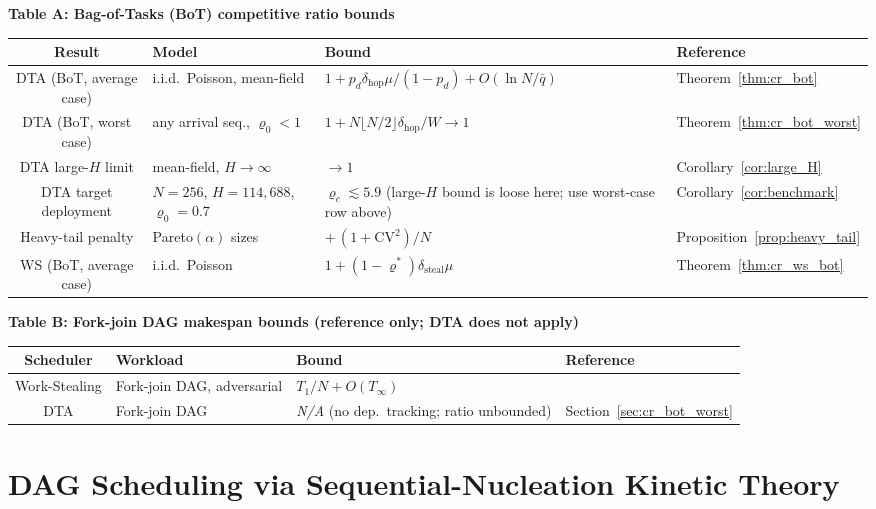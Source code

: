 \documentclass[11pt,a4paper]{report}
\begin{document}
\medskip
\noindent\textbf{Table A: Bag-of-Tasks (BoT) competitive ratio bounds}

\begin{center}
\begin{tabularx}{\textwidth}{@{}clXl@{}}
\toprule
Result & Model & Bound & Reference \\
\midrule
DTA (BoT, average case) & i.i.d.\ Poisson, mean-field
  & $1 + p_d\delta_{\mathrm{hop}}\mu/(1-p_d) + O(\ln N/\bar q)$
  & Theorem~\ref{thm:cr_bot} \\
DTA (BoT, worst case) & any arrival seq., $\varrho_0 < 1$
  & $1 + N\lfloor N/2\rfloor\delta_{\mathrm{hop}}/W \to 1$
  & Theorem~\ref{thm:cr_bot_worst} \\
DTA large-$H$ limit & mean-field, $H\to\infty$
  & $\to 1$
  & Corollary~\ref{cor:large_H} \\
DTA target deployment & $N=256$, $H=114{,}688$, $\varrho_0{=}0.7$
  & $\varrho_c \lesssim 5.9$ (large-$H$ bound is loose here; use worst-case row above)
  & Corollary~\ref{cor:benchmark} \\
Heavy-tail penalty & Pareto$(\alpha)$ sizes
  & $+\,(1+\mathrm{CV}^2)/N$
  & Proposition~\ref{prop:heavy_tail} \\
WS (BoT, average case) & i.i.d.\ Poisson
  & $1 + (1-\varrho^*)\delta_{\mathrm{steal}}\mu$
  & Theorem~\ref{thm:cr_ws_bot} \\
\bottomrule
\end{tabularx}
\end{center}

\medskip
\noindent\textbf{Table B: Fork-join DAG makespan bounds (reference only; DTA does not apply)}

\begin{center}
\begin{tabularx}{\textwidth}{@{}clXl@{}}
\toprule
Scheduler & Workload & Bound & Reference \\
\midrule
Work-Stealing & Fork-join DAG, adversarial & $T_1/N + O(T_\infty)$ & \cite{blumofe1999} \\
DTA & Fork-join DAG & \textit{N/A} (no dep.\ tracking; ratio unbounded) & Section~\ref{sec:cr_bot_worst} \\
\bottomrule
\end{tabularx}
\end{center}


\section{DAG Scheduling via Sequential-Nucleation Kinetic Theory}
\label{sec:dag_kinetic}
\end{document}
